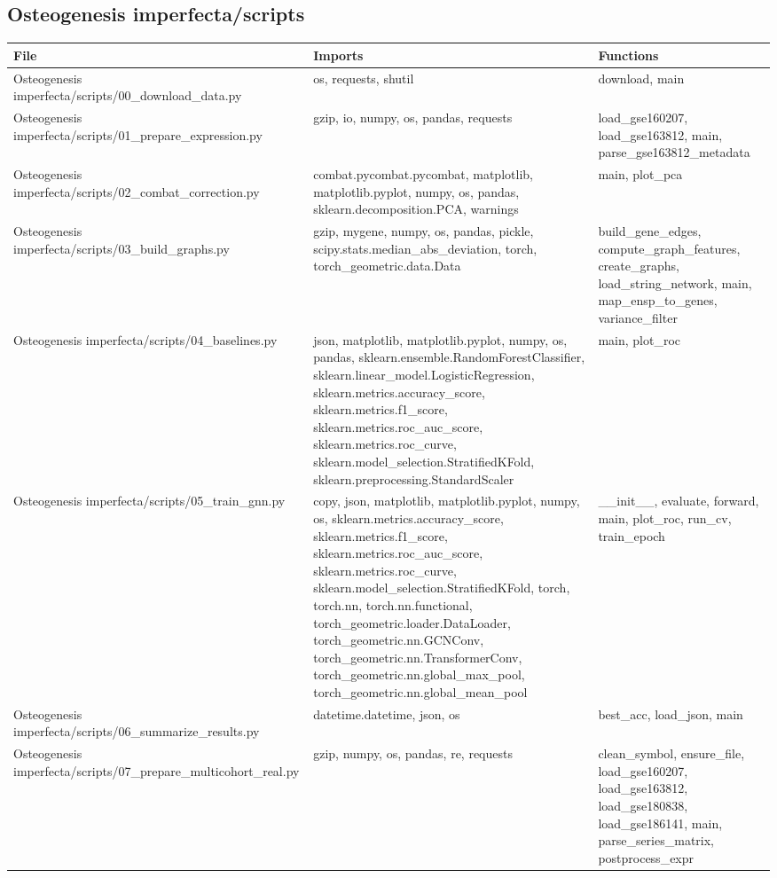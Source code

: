 \documentclass[11pt]{article}
\begin{document}
\subsection{Osteogenesis imperfecta/scripts}
\begin{longtable}{p{}p{}p{}}
\textbf{File} & \textbf{Imports} & \textbf{Functions} \\ \hline
Osteogenesis imperfecta/scripts/00\_download\_data.py & os, requests, shutil & download, main \\
Osteogenesis imperfecta/scripts/01\_prepare\_expression.py & gzip, io, numpy, os, pandas, requests & load\_gse160207, load\_gse163812, main, parse\_gse163812\_metadata \\
Osteogenesis imperfecta/scripts/02\_combat\_correction.py & combat.pycombat.pycombat, matplotlib, matplotlib.pyplot, numpy, os, pandas, sklearn.decomposition.PCA, warnings & main, plot\_pca \\
Osteogenesis imperfecta/scripts/03\_build\_graphs.py & gzip, mygene, numpy, os, pandas, pickle, scipy.stats.median\_abs\_deviation, torch, torch\_geometric.data.Data & build\_gene\_edges, compute\_graph\_features, create\_graphs, load\_string\_network, main, map\_ensp\_to\_genes, variance\_filter \\
Osteogenesis imperfecta/scripts/04\_baselines.py & json, matplotlib, matplotlib.pyplot, numpy, os, pandas, sklearn.ensemble.RandomForestClassifier, sklearn.linear\_model.LogisticRegression, sklearn.metrics.accuracy\_score, sklearn.metrics.f1\_score, sklearn.metrics.roc\_auc\_score, sklearn.metrics.roc\_curve, sklearn.model\_selection.StratifiedKFold, sklearn.preprocessing.StandardScaler & main, plot\_roc \\
Osteogenesis imperfecta/scripts/05\_train\_gnn.py & copy, json, matplotlib, matplotlib.pyplot, numpy, os, sklearn.metrics.accuracy\_score, sklearn.metrics.f1\_score, sklearn.metrics.roc\_auc\_score, sklearn.metrics.roc\_curve, sklearn.model\_selection.StratifiedKFold, torch, torch.nn, torch.nn.functional, torch\_geometric.loader.DataLoader, torch\_geometric.nn.GCNConv, torch\_geometric.nn.TransformerConv, torch\_geometric.nn.global\_max\_pool, torch\_geometric.nn.global\_mean\_pool & \_\_init\_\_, evaluate, forward, main, plot\_roc, run\_cv, train\_epoch \\
Osteogenesis imperfecta/scripts/06\_summarize\_results.py & datetime.datetime, json, os & best\_acc, load\_json, main \\
Osteogenesis imperfecta/scripts/07\_prepare\_multicohort\_real.py & gzip, numpy, os, pandas, re, requests & clean\_symbol, ensure\_file, load\_gse160207, load\_gse163812, load\_gse180838, load\_gse186141, main, parse\_series\_matrix, postprocess\_expr \\

\end{longtable}
\end{document}

